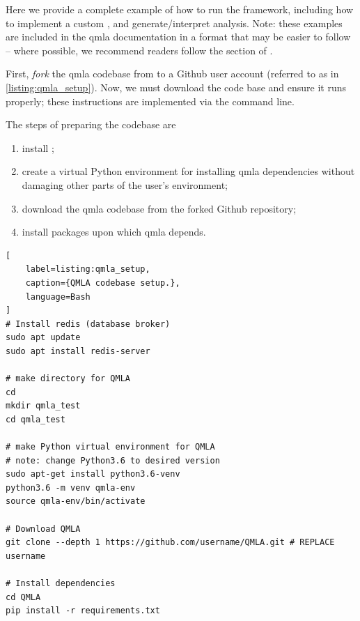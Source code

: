 Here we provide a complete example of how to run the  framework, 
    including how to implement a custom , 
    and generate/interpret analysis.
Note: these examples are included in the \gls{qmla} documentation in a format that may be easier to follow -- 
    where possible, we recommend readers follow the  section of \cite{qmla_docs}.

\par 

First, \emph{fork} the \gls{qmla} codebase from \cite{flynn2021QMLA}
    to a Github user account (referred to as  in \cref{listing:qmla_setup}).
Now, we must download the code base and ensure it runs properly;
    these instructions are implemented via the command line\footnotemark. 

The steps of preparing the codebase are 
\begin{enumerate}
\item install ;
\item create a virtual Python environment for installing \gls{qmla} dependencies without damaging other parts of 
the user's environment;
\item download the \gls{qmla} codebase from 
    the forked Github repository;
\item install packages upon which \gls{qmla} depends. 
\end{enumerate}
    
\begin{lstlisting}[
    label=listing:qmla_setup,
    caption={QMLA codebase setup.},
    language=Bash
]
# Install redis (database broker)
sudo apt update
sudo apt install redis-server
 
# make directory for QMLA
cd
mkdir qmla_test
cd qmla_test

# make Python virtual environment for QMLA
# note: change Python3.6 to desired version
sudo apt-get install python3.6-venv 
python3.6 -m venv qmla-env    
source qmla-env/bin/activate

# Download QMLA
git clone --depth 1 https://github.com/username/QMLA.git # REPLACE username

# Install dependencies
cd QMLA 
pip install -r requirements.txt 
\end{lstlisting}

